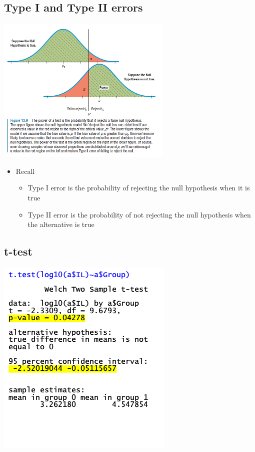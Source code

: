 \documentclass[
]{book}
\providecommand{\tightlist}{%
  \setlength{\itemsep}{0pt}\setlength{\parskip}{0pt}}
\begin{document}
\hypertarget{type-i-and-type-ii-errors-1}{%
\subsection{Type I and Type II errors}\label{type-i-and-type-ii-errors-1}}

\includegraphics[width=0.5\linewidth]{./4_29}

\begin{itemize}
\tightlist
\item
  Recall

  \begin{itemize}
  \tightlist
  \item
    Type I error is the probability of rejecting the null hypothesis when it is true
  \item
    Type II error is the probability of not rejecting the null hypothesis when the alternative is true
  \end{itemize}
\end{itemize}

\hypertarget{t-test}{%
\subsection{t-test}\label{t-test}}

\includegraphics[width=0.5\linewidth]{./4_30}
\end{document}
